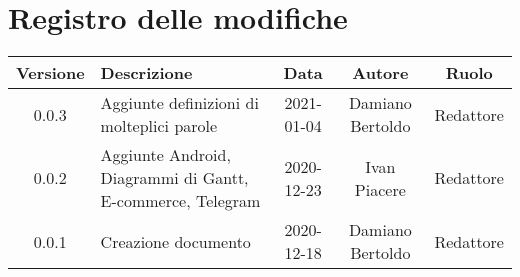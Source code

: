 \section*{Registro delle modifiche}

\begin{center}
	\begin{longtable}{|c|p{5cm}|c|c|c|}
	\hline
	\rowcolor{lighter-grayer}
	\textbf{Versione} & \textbf{Descrizione} & \textbf{Data} & \textbf{Autore} & \textbf{Ruolo} \\
	\hline
	\endfirsthead

	0.0.3 & Aggiunte definizioni di molteplici parole & 2021-01-04 & Damiano Bertoldo & Redattore \\
	\hline
	0.0.2 & Aggiunte Android, Diagrammi di Gantt, E-commerce, Telegram & 2020-12-23 & Ivan Piacere & Redattore \\
	\hline
	0.0.1 & Creazione documento & 2020-12-18 & Damiano Bertoldo & Redattore \\
	\hline

	\end{longtable}
\end{center}